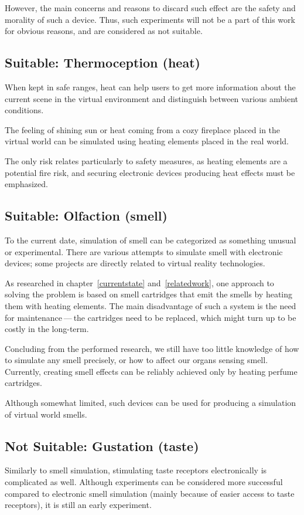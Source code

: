 However, the main concerns and reasons to discard such effect are the
safety and morality of such a device. Thus, such experiments will not be
a part of this work for obvious reasons, and are considered as not suitable.


\hypertarget{x-suitable:-thermoception-(heat)}{\subsection{Suitable: Thermoception (heat)}}
When kept in safe ranges, heat can help users to get more information about the
current scene in the virtual environment and distinguish between 
various ambient conditions.

The feeling of shining sun or heat coming from a cozy fireplace placed in the
virtual world can be simulated using heating elements placed in the real world.

The only risk relates particularly to safety measures, as heating elements are
a potential fire risk, and securing electronic devices producing heat effects
must be emphasized.


\hypertarget{x-suitable:-olfaction-(smell)}{\subsection{Suitable: Olfaction (smell)}}
To the current date, simulation of smell can be categorized as something unusual
or experimental. There are various attempts to simulate smell with electronic
devices; some projects are directly related to virtual reality technologies.


As researched in chapter~\ref{currentstate} and~\ref{relatedwork},
one approach to solving the problem is based on smell
cartridges that emit the smells by heating them with heating elements.
The main disadvantage of such a system is the need for maintenance — the
cartridges need to be replaced, which might turn up to be costly in the
long-term.


Concluding from the performed research, we still have too little
knowledge of how to simulate any smell precisely, or how to affect our organs
sensing smell. Currently, creating smell effects can be reliably achieved
only by heating perfume cartridges.


Although somewhat limited, such devices can be used for producing a simulation
of virtual world smells.


\hypertarget{x-not-suitable:-gustation-(taste)}{\subsection{Not Suitable: Gustation (taste)}}
Similarly to smell simulation, stimulating taste receptors electronically is
complicated as well. Although experiments can be considered more successful
compared to electronic smell simulation (mainly because of easier access
to taste receptors), it is still an early experiment.\,\cite{stsie}


